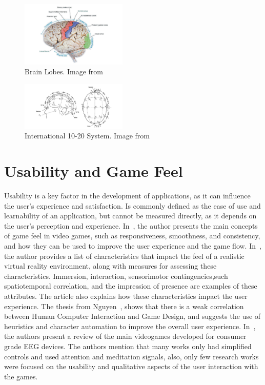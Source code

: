 \begin{figure}[htbp!]
    \centering
    \includegraphics[width=0.45\textwidth]{Figures/Related/brain_lobes}
    \caption{Brain Lobes. Image from~\cite{Harrison2015}}\label{fig:brain_lobes}
\end{figure}
\begin{figure}[htbp!]
    \centering
    \includegraphics[width=0.45\textwidth]{Figures/Related/international_10_20_system}
    \caption{International 10-20 System. Image from~\cite{luis2012brain}}\label{fig:international_10_20_system}
\end{figure}
\section{Usability and Game Feel}
Usability is a key factor in the development of applications, as it can influence the user's experience and satisfaction.
Is commonly defined as the ease of use and learnability of an application, but cannot be measured directly, as it depends on the user's perception and experience.
In~\cite{swink2008game}, the author presents the main concepts of game feel in video games, such as responsiveness, smoothness, and consistency, and how they can be used to improve the user experience and the game flow.
In~\cite{perez2018virtual}, the author provides a list of characteristics that impact the feel of a realistic virtual reality environment, along with measures for assessing these characteristics.
Immersion, interaction, sensorimotor contingencies,such spatiotemporal correlation, and the impression of presence are examples of these attributes.
The article also explains how these characteristics impact the user experience. 
The thesis from Nguyen~\cite{nguyen2012human}, shows that there is a weak correlation between Human Computer Interaction and Game Design, and suggests the use of heuristics and character automation to improve the overall user experience.
In~\cite{doi:10.1080/10447318.2019.1612213}, the authors present a review of the main videogames developed for consumer grade EEG devices.
The authors mention that many works only had simplified controls and used attention and meditation signals, also, only few research works were focused on the usability and qualitative aspects of the user interaction with the games.

